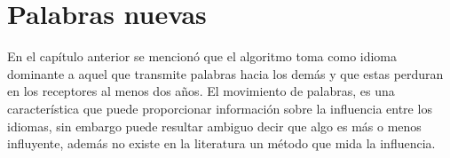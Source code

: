 \chapter{Palabras nuevas}



En el capítulo anterior se mencionó que el algoritmo toma como  idioma
dominante a aquel que transmite palabras hacia los demás y que estas perduran en los receptores al menos dos años.  El movimiento de palabras, es una característica que puede proporcionar información sobre la influencia entre los idiomas, sin embargo  puede resultar ambiguo decir que algo es más o menos influyente, además  no existe en la literatura un método que mida la influencia.






% 
% 



 


